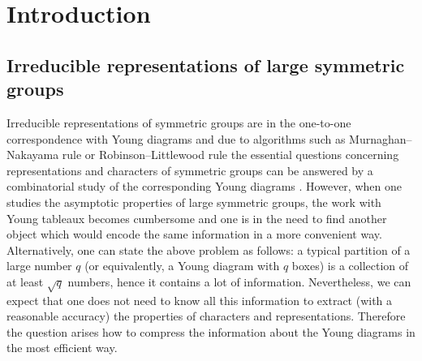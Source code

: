 \documentclass[12pt,dvips]{amsart}
\numberwithin{equation}{section} \numberwithin{figure}{section}
\theoremstyle{plain}
\theoremstyle{definition}
\theoremstyle{remark}
\begin{document}
\maketitle






%




%





\section{Introduction}





\subsection{Irreducible representations of large symmetric groups}

\label{subsec:need}

Irreducible representations of symmetric groups are in the
one-to-one correspondence with Young diagrams and due to algorithms
such as Murnaghan--Nakayama rule or Robinson--Littlewood rule the
essential questions concerning representations and characters of
symmetric groups can be answered by a combinatorial study of the
corresponding Young diagrams \cite{FultonYoungtableaux}. However,
when one studies the asymptotic properties of large symmetric
groups, the work with Young tableaux becomes cumbersome and one is
in the need to find another object which would encode the same
information in a more convenient way. Alternatively, one can state
the above problem as follows: a typical partition of a large number
$q$ (or equivalently, a Young diagram with $q$ boxes) is a
collection of at least $\sqrt{q}$ numbers, hence it contains a lot
of information. Nevertheless, we can expect that one does not need
to know all this information to extract (with a reasonable accuracy)
the properties of characters and representations. Therefore the
question arises how to compress the information about the Young
diagrams in the most efficient way.
\end{document}
